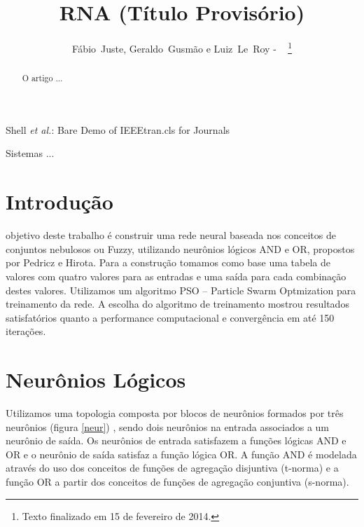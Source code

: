 \documentclass{IEEEtran}
\begin{document}
%
\title{RNA (Título Provisório)}
%
%
%

\author{Fábio~Juste, Geraldo~Gusmão e Luiz~Le~Roy - ~
\thanks{Texto finalizado em 15 de fevereiro de 2014.}}

%
{Shell \MakeLowercase{\textit{et al.}}: Bare Demo of IEEEtran.cls for Journals}

\maketitle

\begin{abstract}
O artigo ...
\end{abstract}

\begin{IEEEkeywords}
Sistemas ...
\end{IEEEkeywords}

\IEEEpeerreviewmaketitle

\section{Introdução}
 objetivo deste trabalho é construir uma rede neural baseada nos conceitos de conjuntos nebulosos ou Fuzzy,  utilizando neurônios lógicos AND e OR, propostos por Pedricz e Hirota.
Para a construção tomamos como base uma  tabela de valores com quatro valores para as entradas e uma saída para cada combinação destes valores. Utilizamos um algoritmo PSO – Particle Swarm Optmization para treinamento da rede.  A escolha do algoritmo de treinamento mostrou resultados satisfatórios quanto a performance computacional  e convergência em até 150 iterações.

\section{Neurônios Lógicos}
Utilizamos uma topologia composta por blocos de neurônios formados por três neurônios (figura \ref{neur}) , sendo dois neurônios na entrada associados a um neurônio de saída. Os neurônios de entrada satisfazem a funções lógicas AND e OR e o neurônio de saída satisfaz a função lógica OR. A função AND é modelada  através do uso dos conceitos de funções de agregação disjuntiva (t-norma) e a função OR  a partir dos conceitos de funções de agregação conjuntiva (s-norma).
\end{document}
